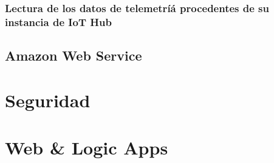 \documentclass[10pt]{article}
\begin{document}
\subsubsection{Lectura de los datos de telemetríá procedentes de su instancia de
IoT Hub}



\subsection*{Amazon Web Service}

\section{Seguridad}

\section{Web \& Logic Apps}
\end{document}
